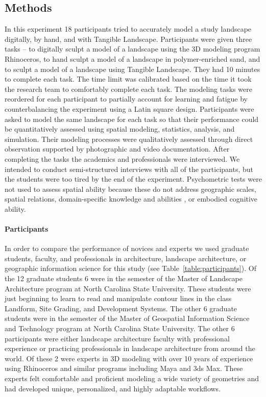 \documentclass[Afour,sagev,times]{sagej} %
\begin{document}
\subsection{Methods}
In this experiment 
18 participants tried to accurately model a study landscape 
digitally, by hand, and with Tangible Landscape. 
Participants were given three tasks -- 
to digitally sculpt a model of a landscape 
using the 3D modeling program Rhinoceros, 
to hand sculpt a model of a landscape in polymer-enriched sand,
and to sculpt a model of a landscape using Tangible Landscape.
They had 10 minutes to complete each task. 
The time limit was calibrated based on 
the time it took the research team 
to comfortably complete each task. 
The modeling tasks were reordered for each participant
to partially account for learning and fatigue
by counterbalancing the experiment using a Latin square design.
Participants were asked to model the same landscape for each task 
so that their performance could be quantitatively assessed 
using spatial modeling, statistics, analysis, and simulation.
Their modeling processes were qualitatively assessed 
through direct observation
supported by photographic and video documentation. 
After completing the tasks
the academics and professionals 
were interviewed. 
We intended to conduct semi-structured interviews 
with all of the participants, but
the students were too tired by the end of the experiment. 
Psychometric tests were not used
to assess spatial ability because
these do not address 
geographic scales,
spatial relations,
domain-specific knowledge and abilities 
\cite{Lee2009,Bednarz2011,Wakabayashi2011},
or embodied cognitive ability. 

\paragraph{Participants}
In order to compare the performance of novices and experts
we used graduate students, faculty, and professionals 
in architecture, landscape architecture, or geographic information science
for this study (see Table~\ref{table:participants}).
Of the 12 graduate students 6 were in the  semester of the 
Master of Landscape Architecture program 
at North Carolina State University.
These students were just beginning to learn to read and manipulate contour lines 
in the class Landform, Site Grading, and Development Systems. 
The other 6 graduate students were in the  semester of the 
Master of Geospatial Information Science and Technology program 
at North Carolina State University.
The other 6 participants were either landscape architecture faculty 
with professional experience or practicing professionals in landscape architecture 
from around the world. 
Of these 2 were experts in 3D modeling with over 10 years of experience 
using Rhinoceros and similar programs including Maya and 3ds Max. 
These experts felt comfortable and proficient modeling a wide variety of geometries 
and had developed unique, personalized, and highly adaptable workflows.
\end{document}
